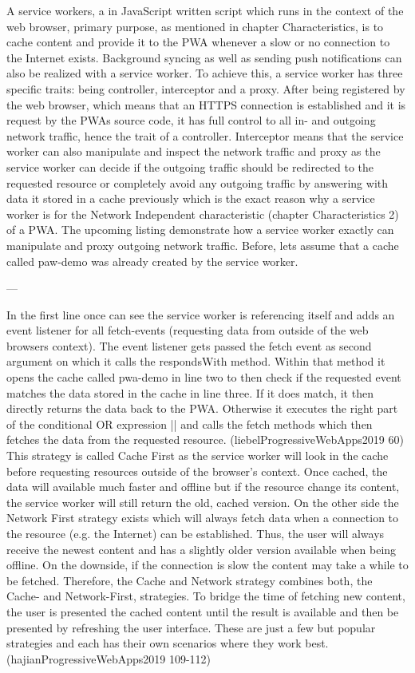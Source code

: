 A service workers, a in JavaScript written script which runs in the context of the web browser, primary purpose, as mentioned in chapter Characteristics, is to cache content and provide it to the PWA whenever a slow or no connection to the Internet exists. Background syncing as well as sending push notifications can also be realized with a service worker. To achieve this, a service worker has three specific traits: being controller, interceptor and a proxy. 
\newline
After being registered by the web browser, which means that an HTTPS connection is established and it is request by the PWAs source code, it has full control to all in- and outgoing network traffic, hence the trait of a controller. Interceptor means that the service worker can also manipulate and inspect the network traffic and proxy as the service worker can decide if the outgoing traffic should be redirected to the requested resource or completely avoid any outgoing traffic by answering with data it stored in a cache previously which is the exact reason why a service worker is for the Network Independent characteristic (chapter Characteristics 2) of a PWA.
\newline
The upcoming listing demonstrate how a service worker exactly can manipulate and proxy outgoing network traffic. Before, lets assume that a cache called paw-demo was already created by the service worker.

---

In the first line once can see the service worker is referencing itself and adds an event listener for all fetch-events (requesting data from outside of the web browsers context). The event listener gets passed the fetch event as second argument on which it calls the respondsWith method. Within that method it opens the cache called pwa-demo in line two to then check if the requested event matches the data stored in the cache in line three. If it does match, it then directly returns the data back to the PWA. Otherwise it executes the right part of the conditional OR expression || and calls the fetch methods which then fetches the data from the requested resource. (liebelProgressiveWebApps2019 60)
\newline
This strategy is called Cache First as the service worker will look in the cache before requesting resources outside of the browser’s context. Once cached, the data will available much faster and offline but if the resource change its content, the service worker will still return the old, cached version. On the other side the Network First strategy exists which will always fetch data when a connection to the resource (e.g. the Internet) can be established. Thus, the user will always receive the newest content and has a slightly older version available when being offline. On the downside, if the connection is slow the content may take a while to be fetched. Therefore, the Cache and Network strategy combines both, the Cache- and Network-First, strategies. To bridge the time of fetching new content, the user is presented the cached content until the result is available and then be presented by refreshing the user interface. These are just a few but popular strategies and each has their own scenarios where they work best. (hajianProgressiveWebApps2019 109-112)

